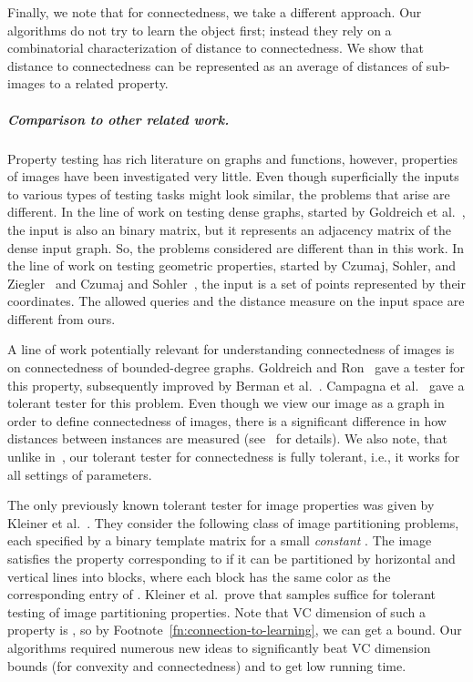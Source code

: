 \documentclass[11pt,english]{article}
\numberwithin{figure}{section}
\begin{document}
Finally, we note that for connectedness, we take a different approach. Our algorithms do not try to learn the object first; instead they rely on a combinatorial characterization of distance to connectedness. We show that distance to connectedness can be represented as an average of distances of sub-images to a related property.
\subparagraph{Comparison to other related work.}
Property testing has rich literature on graphs and functions, however, properties of images have been investigated very little. Even though superficially the inputs to various types of testing tasks might look similar, the problems that arise are different.
In the line of work on testing dense graphs, started by Goldreich et al.~\cite{GGR98}, the input is also an  binary matrix, but it represents an adjacency matrix of the dense input graph. So, the problems considered are different than in this work.
In the line of work on testing geometric properties, started by Czumaj, Sohler, and Ziegler~\cite{CzumajSZ00} and Czumaj and Sohler~\cite{CS01}, the input is a set of points represented by their coordinates. The allowed queries and the distance measure on the input space are different from ours. 


A line of work potentially relevant for understanding connectedness of images is on connectedness of bounded-degree graphs. Goldreich and Ron~\cite{GR02}  gave a tester for this property, subsequently improved by Berman et al.~\cite{BermanRY14}. Campagna et al.~\cite{CampagnaGR13} gave a tolerant tester for this problem. Even though we view our image as a graph in order to define connectedness of images, there is a significant difference in how distances between instances are measured (see~\cite{Ras03} for details). We also note, that unlike in~\cite{CampagnaGR13}, our tolerant tester for connectedness is fully tolerant, i.e., it works for all settings of parameters.


The only previously known tolerant tester for image properties was given by Kleiner et al.~\cite{KleinerKNB11}. They consider the following class of image partitioning problems, each specified by a  binary template matrix  for a small {\em constant} . The image satisfies the property corresponding to  if it can be partitioned by  horizontal and  vertical lines into blocks, where each block has the same color as the corresponding entry of . Kleiner et al.\ prove that  samples suffice for tolerant testing of image partitioning properties. Note that VC dimension of such a property is , so by Footnote~\ref{fn:connection-to-learning}, we can get a  bound. Our algorithms required numerous new ideas to significantly beat VC dimension bounds (for convexity and connectedness) and to get low running time.
\end{document}

